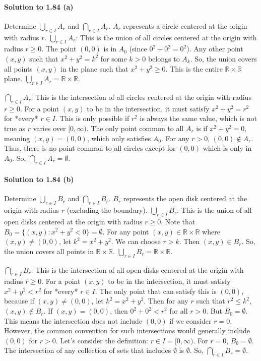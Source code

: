 \documentclass{article}
\begin{document}
\paragraph*{Solution to 1.84 (a)}
Determine $\bigcup_{r \in I} A_r$ and $\bigcap_{r \in I} A_r$.
$A_r$ represents a circle centered at the origin with radius $r$.
$\bigcup_{r \in I} A_r$: This is the union of all circles centered at the origin with radius $r \ge 0$.
The point $(0,0)$ is in $A_0$ (since $0^2+0^2=0^2$). Any other point $(x,y)$ such that $x^2+y^2=k^2$ for some $k>0$ belongs to $A_k$.
So, the union covers all points $(x,y)$ in the plane such that $x^2+y^2 \ge 0$. This is the entire $\mathbb{R} \times \mathbb{R}$ plane.
$\bigcup_{r \in I} A_r = \mathbb{R} \times \mathbb{R}$.

$\bigcap_{r \in I} A_r$: This is the intersection of all circles centered at the origin with radius $r \ge 0$.
For a point $(x,y)$ to be in the intersection, it must satisfy $x^2+y^2 = r^2$ for *every* $r \in I$.
This is only possible if $r^2$ is always the same value, which is not true as $r$ varies over $[0, \infty)$.
The only point common to all $A_r$ is if $x^2+y^2=0$, meaning $(x,y)=(0,0)$, which only satisfies $A_0$. For any $r>0$, $(0,0) \notin A_r$.
Thus, there is no point common to all circles except for $(0,0)$ which is only in $A_0$.
So, $\bigcap_{r \in I} A_r = \emptyset$.

\paragraph*{Solution to 1.84 (b)}
Determine $\bigcup_{r \in I} B_r$ and $\bigcap_{r \in I} B_r$.
$B_r$ represents the open disk centered at the origin with radius $r$ (excluding the boundary).
$\bigcup_{r \in I} B_r$: This is the union of all open disks centered at the origin with radius $r \ge 0$.
Note that $B_0 = \{(x,y) : x^2+y^2 < 0\} = \emptyset$.
For any point $(x,y) \in \mathbb{R} \times \mathbb{R}$ where $(x,y) \neq (0,0)$, let $k^2 = x^2+y^2$. We can choose $r > k$. Then $(x,y) \in B_r$.
So, the union covers all points in $\mathbb{R} \times \mathbb{R}$.
$\bigcup_{r \in I} B_r = \mathbb{R} \times \mathbb{R}$.

$\bigcap_{r \in I} B_r$: This is the intersection of all open disks centered at the origin with radius $r \ge 0$.
For a point $(x,y)$ to be in the intersection, it must satisfy $x^2+y^2 < r^2$ for *every* $r \in I$.
The only point that can satisfy this is $(0,0)$, because if $(x,y) \neq (0,0)$, let $k^2 = x^2+y^2$. Then for any $r$ such that $r^2 \le k^2$, $(x,y) \notin B_r$.
If $(x,y) = (0,0)$, then $0^2+0^2 < r^2$ for all $r>0$. But $B_0 = \emptyset$. This means the intersection does not include $(0,0)$ if we consider $r=0$.
However, the common convention for such intersections would generally include $(0,0)$ for $r>0$.
Let's consider the definition: $r \in I = [0, \infty)$.
For $r=0$, $B_0 = \emptyset$. The intersection of any collection of sets that includes $\emptyset$ is $\emptyset$.
So, $\bigcap_{r \in I} B_r = \emptyset$.
\end{document}
